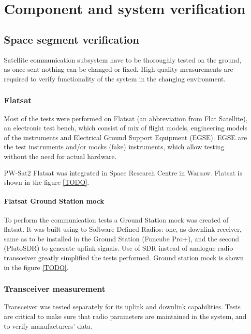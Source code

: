 \part{Component and system verification}



\chapter{Space segment verification}

Satellite communication subsystem have to be thoroughly tested on the ground, as once sent nothing can be changed or fixed. High quality measurements are required to verify functionality of the system in the changing environment.

\section{Flatsat}

Most of the tests were performed on Flatsat (an abbreviation from Flat Satellite), an electronic test bench, which consist of mix of flight models, engineering models of the instruments and Electrical Ground Support Equipment (EGSE). EGSE are the test instruments and/or mocks (fake) instruments, which allow testing without the need for actual hardware.

PW-Sat2 Flatsat was integrated in Space Research Centre in Warsaw. Flatsat is shown in the figure \ref{TODO}.

\subsection{Flatsat Ground Station mock}
To perform the communication tests a Ground Station mock was created of flatsat. It was built using to Software-Defined Radios: one, as downlink receiver, same as to be installed in the Ground Station (Funcube Pro+), and the second (PlutoSDR) to generate uplink signals. Use of SDR instead of analogue radio transceiver greatly simplified the tests performed. Ground station mock is shown in the figure \ref{TODO}. 


\section{Transceiver measurement}
Transceiver was tested separately for its uplink and downlink capabilities. Tests are critical to make sure that radio parameters are maintained in the system, and to verify manufacturers' data.

